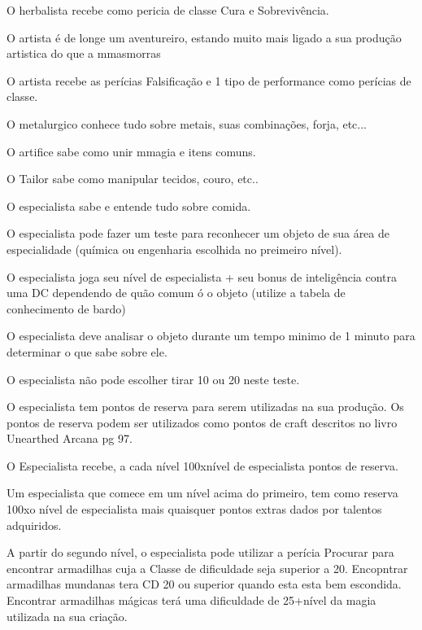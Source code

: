 \begin{description}
\begin{description}
O herbalista recebe como pericia de classe Cura e Sobreviv\^encia.

\item[Artes]
O artista \'e de longe um aventureiro, estando muito mais ligado
a sua produ\c{c}\~ao artistica do que a mmasmorras

O artista recebe as per\'icias Falsifica\c{c}\~ao e 1 tipo de
performance como per\'icias de classe.

\item[Metalurgia]
O metalurgico conhece tudo sobre metais, suas combina\c{c}\~oes, forja, etc...

\item[Artificio]
O artifice sabe como unir mmagia e itens comuns.

\item[Tailoring]
O Tailor sabe como manipular tecidos, couro, etc..

\item[Gastronomia]
O especialista sabe e entende tudo sobre comida.
\end{description}

\item[Conhecimento de especialista] O especialista pode fazer um teste
para reconhecer um objeto de sua \'area de especialidade
(qu\'imica ou engenharia escolhida no preimeiro n\'ivel).

O especialista joga seu n\'ivel de especialista + seu bonus de
intelig\^encia contra uma DC dependendo de qu\~ao comum \'o o
objeto (utilize a tabela de conhecimento de bardo)

O especialista deve analisar o objeto durante um tempo minimo de 1 minuto
para determinar o que sabe sobre ele.

O especialista n\~ao pode escolher tirar 10 ou 20 neste teste.

\item[Reserva de of\'icio]
O especialista tem pontos de reserva para serem utilizadas na sua produ\c{c}\~ao.
Os pontos de reserva podem ser utilizados como pontos de craft descritos no livro
Unearthed Arcana pg 97.

O Especialista recebe, a cada n\'ivel 100xn\'ivel de especialista pontos de reserva.

Um especialista que comece em um n\'ivel acima do primeiro, tem como reserva
100xo n\'ivel de especialista mais quaisquer pontos extras dados por
talentos adquiridos.

\item[Encontrar armadilhas]
A partir do segundo n\'ivel, o especialista pode
utilizar a per\'icia Procurar para encontrar
armadilhas cuja a Classe de dificuldade seja superior a 20.
Encopntrar armadilhas mundanas tera CD 20 ou superior quando esta
esta bem escondida. Encontrar armadilhas m\'agicas ter\'a uma
dificuldade de 25+n\'ivel da magia utilizada na sua cria\c{c}\~ao.


\end{description}
